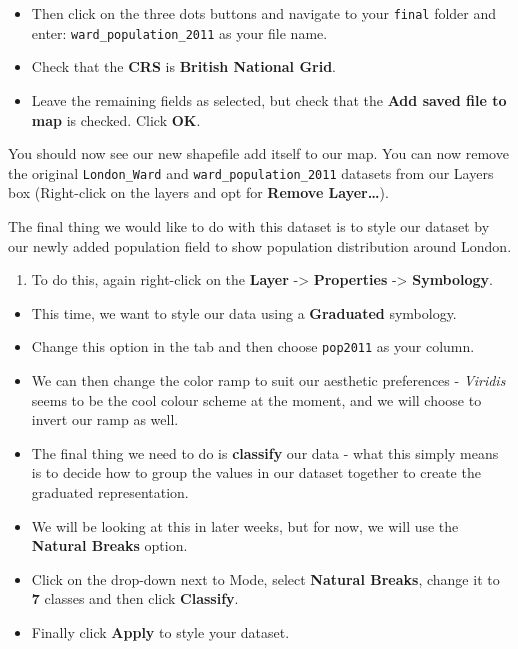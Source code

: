 \documentclass[
]{book}
\providecommand{\tightlist}{%
  \setlength{\itemsep}{0pt}\setlength{\parskip}{0pt}}
\begin{document}
\begin{itemize}
\tightlist
\item
  Then click on the three dots buttons and navigate to your \texttt{final} folder and enter: \texttt{ward\_population\_2011} as your file name.
\item
  Check that the \textbf{CRS} is \textbf{British National Grid}.
\item
  Leave the remaining fields as selected, but check that the \textbf{Add saved file to map} is checked. Click \textbf{OK}.
\end{itemize}

You should now see our new shapefile add itself to our map. You can now remove the original \texttt{London\_Ward} and \texttt{ward\_population\_2011} datasets from our Layers box (Right-click on the layers and opt for \textbf{Remove Layer\ldots{}}).

The final thing we would like to do with this dataset is to style our dataset by our newly added population field to show population distribution around London.

\begin{enumerate}
\def\labelenumi{\arabic{enumi}.}
\setcounter{enumi}{19}
\tightlist
\item
  To do this, again right-click on the \textbf{Layer} -\textgreater{} \textbf{Properties} -\textgreater{} \textbf{Symbology}.
\end{enumerate}

\begin{itemize}
\tightlist
\item
  This time, we want to style our data using a \textbf{Graduated} symbology.
\item
  Change this option in the tab and then choose \texttt{pop2011} as your column.
\item
  We can then change the color ramp to suit our aesthetic preferences - \emph{Viridis} seems to be the cool colour scheme at the moment, and we will choose to invert our ramp as well.
\item
  The final thing we need to do is \textbf{classify} our data - what this simply means is to decide how to group the values in our dataset together to create the graduated representation.
\item
  We will be looking at this in later weeks, but for now, we will use the \textbf{Natural Breaks} option.
\item
  Click on the drop-down next to Mode, select \textbf{Natural Breaks}, change it to \textbf{7} classes and then click \textbf{Classify}.
\item
  Finally click \textbf{Apply} to style your dataset.
\end{itemize}
\end{document}
